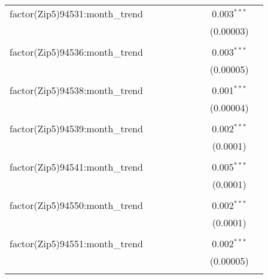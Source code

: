 \begin{table}[H]
{\begin{tabular}{@{\extracolsep{5pt}}lcccccccc}
  factor(Zip5)94531:month\_trend &  &  &  &  &  &  & 0.003$^{***}$ &  \\  

   &  &  &  &  &  &  & (0.00003) &  \\  

   & & & & & & & & \\  

  factor(Zip5)94536:month\_trend &  &  &  &  &  &  & 0.003$^{***}$ &  \\  

   &  &  &  &  &  &  & (0.00005) &  \\  

   & & & & & & & & \\  

  factor(Zip5)94538:month\_trend &  &  &  &  &  &  & 0.001$^{***}$ &  \\  

   &  &  &  &  &  &  & (0.00004) &  \\  

   & & & & & & & & \\  

  factor(Zip5)94539:month\_trend &  &  &  &  &  &  & 0.002$^{***}$ &  \\  

   &  &  &  &  &  &  & (0.0001) &  \\  

   & & & & & & & & \\  

  factor(Zip5)94541:month\_trend &  &  &  &  &  &  & 0.005$^{***}$ &  \\  

   &  &  &  &  &  &  & (0.0001) &  \\  

   & & & & & & & & \\  

  factor(Zip5)94550:month\_trend &  &  &  &  &  &  & 0.002$^{***}$ &  \\  

   &  &  &  &  &  &  & (0.0001) &  \\  

   & & & & & & & & \\  

  factor(Zip5)94551:month\_trend &  &  &  &  &  &  & 0.002$^{***}$ &  \\  

   &  &  &  &  &  &  & (0.00005) &  \\  

   & & & & & & & & \\  


\end{tabular}}
\end{table}
